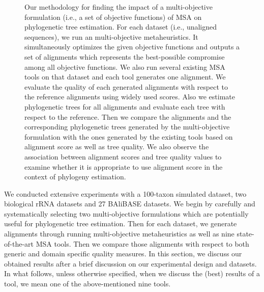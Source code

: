 \begin{figure}[!htbp]
	\caption{Our methodology for finding the impact of a multi-objective formulation (i.e., a set of objective functions) of MSA on phylogenetic tree estimation. For each dataset (i.e., unaligned sequences), we run an multi-objective metaheuristics. It simultaneously optimizes the given objective functions and outputs a set of alignments which represents the best-possible compromise among all objective functions. We also run several existing MSA tools on that dataset and each tool generates one alignment. We evaluate the quality of each generated alignments with respect to the reference alignments using widely used scores. Also we estimate phylogenetic trees for all alignments and evaluate each tree with respect to the reference. Then we compare the alignments and the corresponding phylogenetic trees generated by the multi-objective formulation with the ones generated by the existing tools based on alignment score as well as tree quality. We also observe the association between alignment scores and tree quality values to examine whether it is appropriate to use alignment score in the context of phylogeny estimation.}
	\label{fig:pipeline}
\end{figure}


We conducted extensive experiments with a 100-taxon simulated dataset, two biological rRNA datasets and 27 BAliBASE datasets. We begin by carefully and systematically selecting two multi-objective formulations which are potentially useful for phylogenetic tree estimation. Then for each dataset, we generate alignments through running multi-objective metaheuristics as well as nine state-of-the-art MSA tools. Then we compare those alignments with respect to both generic and domain specific quality measures. In this section, we discuss our obtained results after a brief discussion on our experimental design and datasets. In what follows, unless otherwise specified, when we discuss the (best) results of a tool, we mean one of the above-mentioned nine tools.

